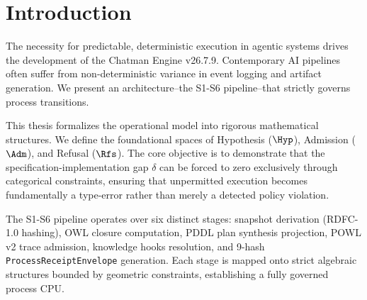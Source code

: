 \chapter{Introduction}
The necessity for predictable, deterministic execution in agentic systems drives the development of the Chatman Engine v26.7.9. Contemporary AI pipelines often suffer from non-deterministic variance in event logging and artifact generation. We present an architecture--the S1-S6 pipeline--that strictly governs process transitions. 

This thesis formalizes the operational model into rigorous mathematical structures. We define the foundational spaces of Hypothesis ($\Hyp$), Admission ($\Adm$), and Refusal ($\Rfs$). The core objective is to demonstrate that the specification-implementation gap $\delta$ can be forced to zero exclusively through categorical constraints, ensuring that unpermitted execution becomes fundamentally a type-error rather than merely a detected policy violation.

The S1-S6 pipeline operates over six distinct stages: snapshot derivation (RDFC-1.0 hashing), OWL closure computation, PDDL plan synthesis projection, POWL v2 trace admission, knowledge hooks resolution, and 9-hash \texttt{ProcessReceiptEnvelope} generation. Each stage is mapped onto strict algebraic structures bounded by geometric constraints, establishing a fully governed process CPU.
